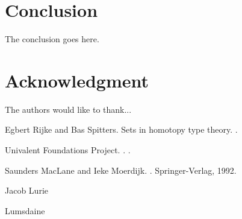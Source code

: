 \documentclass[conference]{IEEEtran}
\begin{document}




\section{Conclusion}
The conclusion goes here.






\section*{Acknowledgment}


The authors would like to thank...




%
%
%
\begin{thebibliography}{4}

Egbert Rijke and Bas Spitters.
\newblock Sets in homotopy type theory.
.

{Univalent Foundations Project}.
.
.

Saunders MacLane and Ieke Moerdijk.
.
\newblock Springer-Verlag, 1992.

Jacob Lurie

Lumsdaine

\end{thebibliography}




\end{document}
